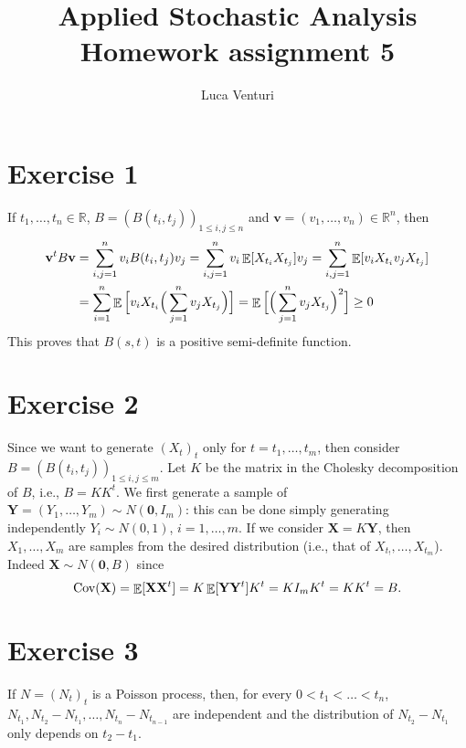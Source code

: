 \documentclass[a4paper,11pt]{article}
\theoremstyle{definition}
\theoremstyle{plain}
\theoremstyle{remark}
\DeclarePairedDelimiter{\parq}{[}{]}
\DeclareMathOperator*{\expval}{\mathbb{E}}
\DeclareMathOperator*{\covval}{\mathrm{Cov}}
\begin{document}
\title{Applied Stochastic Analysis \\ Homework assignment 5}
\author{Luca Venturi}
\maketitle

\section*{Exercise 1}

If $t_1,\dots,t_n\in\mathbb{R}$, $B = (B(t_i,t_j))_{1\leq i,j\leq n}$ and $\mathbf{v}=(v_1,\dots,v_n)\in\mathbb{R}^n$, then
\begin{align*}
\mathbf{v}^tB\mathbf{v} & = \sum_{i,j=1}^n v_iB(t_i,t_j)v_j = \sum_{i,j=1}^n v_i\expval\parq{X_{t_i}X_{t_j}}v_j = \sum_{i,j=1}^n \expval\parq{v_iX_{t_i}v_jX_{t_j}} \\ & = \sum_{i=1}^n \expval\Big[v_iX_{t_i}\Big(\sum_{j=1}^nv_jX_{t_j}\Big)\Big] =  \expval\Big[\Big(\sum_{j=1}^nv_jX_{t_j}\Big)^2\Big] \geq 0
\end{align*}
This proves that $B(s,t)$ is a positive semi-definite function.

\section*{Exercise 2}

Since we want to generate $(X_t)_t$ only for $t=t_1,\dots,t_m$, then consider $B = (B(t_i,t_j))_{1\leq i,j\leq m}$. Let $K$ be the matrix in the Cholesky decomposition of $B$, i.e., $B=KK^t$. We first generate a sample of $\mathbf{Y}=(Y_1,\dots,Y_m)\sim N(\mathbf{0}, I_m)$: this can be done simply generating independently $Y_i\sim N(0,1)$, $i=1,\dots,m$. If we consider $\mathbf{X}=K\mathbf{Y}$, then $X_1,\dots,X_m$ are samples from the desired distribution (i.e., that of $X_{t_!},\dots,X_{t_m}$). Indeed $\mathbf{X}\sim N(\mathbf{0},B)$ since
$$
\covval(\mathbf{X}) = \expval\parq{\mathbf{X}\mathbf{X}^t} = K\expval\parq{\mathbf{Y}\mathbf{Y}^t}K^t = K I_m K^t = KK^t = B.
$$


\section*{Exercise 3}

If $N=(N_t)_t$ is a Poisson process, then, for every $0<t_1<\dots<t_n$, $N_{t_1},N_{t_2}-N_{t_1},\dots,N_{t_n}-N_{t_{n-1}}$ are independent and the distribution of $N_{t_2}-N_{t_1}$ only depends on $t_2-t_1$.
 
\end{document}
